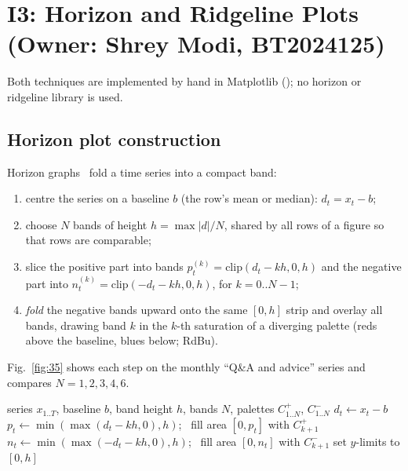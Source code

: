 \section{I3: Horizon and Ridgeline Plots (Owner: Shrey Modi, BT2024125)}
\label{sec:i3}
Both techniques are implemented by hand in Matplotlib (); no horizon or ridgeline
library is used.

\subsection{Horizon plot construction}
Horizon graphs~\cite{saito2005,heer2009} fold a time series into a compact band:
\begin{enumerate}
\item centre the series on a baseline $b$ (the row's mean or median): $d_t=x_t-b$;
\item choose $N$ bands of height $h=\max|d|/N$, shared by all rows of a figure so that rows are comparable;
\item slice the positive part into bands $p_t^{(k)}=\mathrm{clip}(d_t-kh,0,h)$ and the negative part into
  $n_t^{(k)}=\mathrm{clip}(-d_t-kh,0,h)$, for $k=0..N{-}1$;
\item \emph{fold} the negative bands upward onto the same $[0,h]$ strip and overlay all bands, drawing band $k$ in the
  $k$-th saturation of a diverging palette (reds above the baseline, blues below; RdBu).
\end{enumerate}
Fig.~\ref{fig:35} shows each step on the monthly ``Q\&A and advice'' series and compares $N=1,2,3,4,6$.

\begin{algorithm}[!t]
\caption{Horizon band folding for one row}
\label{alg:horizon}
\begin{algorithmic}[1]
\REQUIRE series $x_{1..T}$, baseline $b$, band height $h$, bands $N$, palettes $C^+_{1..N}$, $C^-_{1..N}$
\STATE $d_t\leftarrow x_t-b$
  \STATE $p_t\leftarrow\min(\max(d_t-kh,0),h)$; \ fill area $[0,p_t]$ with $C^+_{k+1}$
  \STATE $n_t\leftarrow\min(\max(-d_t-kh,0),h)$; \ fill area $[0,n_t]$ with $C^-_{k+1}$
\ENDFOR
\STATE set $y$-limits to $[0,h]$ 
\end{algorithmic}
\end{algorithm}


